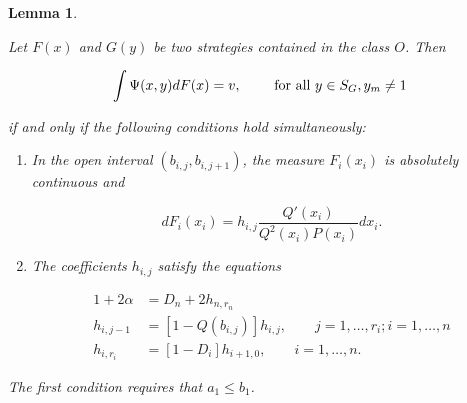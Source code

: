 \documentclass{article}
\newtheorem{lemma}{Lemma}
\begin{document}
\begin{lemma} \label{lemma:coefficient-equations}

Let $F(x)$ and $G(y)$ be two strategies contained in the class $O$. Then

\[
\int \Psi(x, y) dF(x) = v, \qquad \textup{ for all } y \in S_G, y_m \neq 1
\]

if and only if the following conditions hold simultaneously:

\begin{enumerate}

\item In the open interval $(b_{i, j}, b_{i, j+1})$, the measure $F_i(x_i)$ is
absolutely continuous and

\[
dF_i(x_i) = h_{i, j} \frac{Q'(x_i)}{Q^2(x_i) P(x_i)} dx_i.
\]

\item The coefficients $h_{i, j}$ satisfy the equations

\[
\begin{aligned}
1 + 2\alpha &= D_n + 2h_{n, r_n} \\
h_{i, j-1} &= [1 - Q(b_{i, j})] h_{i, j}, \qquad j = 1, \dots, r_i; i = 1,
\dots, n \\
h_{i, r_i} &= [1 - D_i] h_{i+1, 0}, \qquad i = 1, \dots, n.
\end{aligned}
\]

\end{enumerate}

The first condition requires that $a_1 \leq b_1$.

\end{lemma}
\end{document}
